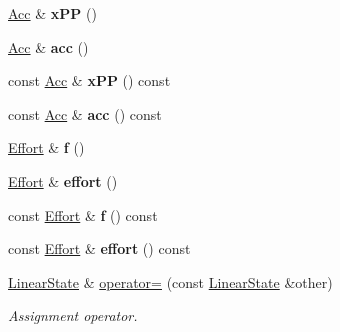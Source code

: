 \begin{DoxyCompactItemize}
\item 
\hyperlink{classow__core_1_1LinearAcceleration}{Acc} \& {\bfseries x\+PP} ()\hypertarget{classow__core_1_1LinearState_a196a9e749b1dfa46829f4266d5515dc7}{}\label{classow__core_1_1LinearState_a196a9e749b1dfa46829f4266d5515dc7}

\item 
\hyperlink{classow__core_1_1LinearAcceleration}{Acc} \& {\bfseries acc} ()\hypertarget{classow__core_1_1LinearState_a1d802b7bc39a9ae1aff3cc9c1839a6ac}{}\label{classow__core_1_1LinearState_a1d802b7bc39a9ae1aff3cc9c1839a6ac}

\item 
const \hyperlink{classow__core_1_1LinearAcceleration}{Acc} \& {\bfseries x\+PP} () const \hypertarget{classow__core_1_1LinearState_a7c4252cbcbd6d1be172a97f9ed0f1db8}{}\label{classow__core_1_1LinearState_a7c4252cbcbd6d1be172a97f9ed0f1db8}

\item 
const \hyperlink{classow__core_1_1LinearAcceleration}{Acc} \& {\bfseries acc} () const \hypertarget{classow__core_1_1LinearState_a6bb9495c531690c30dbf7ac503841db5}{}\label{classow__core_1_1LinearState_a6bb9495c531690c30dbf7ac503841db5}

\item 
\hyperlink{classow__core_1_1Force}{Effort} \& {\bfseries f} ()\hypertarget{classow__core_1_1LinearState_a7ff79092c8ac67b5ba40d20c2d77cd67}{}\label{classow__core_1_1LinearState_a7ff79092c8ac67b5ba40d20c2d77cd67}

\item 
\hyperlink{classow__core_1_1Force}{Effort} \& {\bfseries effort} ()\hypertarget{classow__core_1_1LinearState_a9e52609dd9e68c861b1392a643e91b17}{}\label{classow__core_1_1LinearState_a9e52609dd9e68c861b1392a643e91b17}

\item 
const \hyperlink{classow__core_1_1Force}{Effort} \& {\bfseries f} () const \hypertarget{classow__core_1_1LinearState_a8862e3343c7d9331f19b246377395b6d}{}\label{classow__core_1_1LinearState_a8862e3343c7d9331f19b246377395b6d}

\item 
const \hyperlink{classow__core_1_1Force}{Effort} \& {\bfseries effort} () const \hypertarget{classow__core_1_1LinearState_a05e33f3283513f6aba6bb65bcd7c5549}{}\label{classow__core_1_1LinearState_a05e33f3283513f6aba6bb65bcd7c5549}

\item 
\hyperlink{classow__core_1_1LinearState}{Linear\+State} \& \hyperlink{classow__core_1_1LinearState_a95fdbea9f5fc1cdf1aac31183b175173}{operator=} (const \hyperlink{classow__core_1_1LinearState}{Linear\+State} \&other)\hypertarget{classow__core_1_1LinearState_a95fdbea9f5fc1cdf1aac31183b175173}{}\label{classow__core_1_1LinearState_a95fdbea9f5fc1cdf1aac31183b175173}

\begin{DoxyCompactList}\small\item\em Assignment operator. \end{DoxyCompactList}\end{DoxyCompactItemize}
